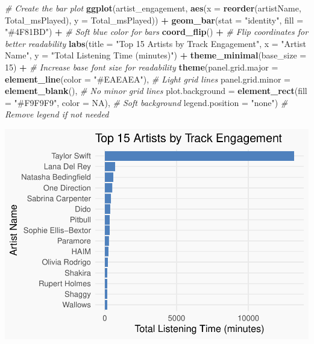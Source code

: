 \documentclass[
]{article}
\newenvironment{Shaded}{\begin{snugshade}}{\end{snugshade}}
\newcommand{\AttributeTok}[1]{\textcolor[rgb]{0.13,0.29,0.53}{#1}}
\newcommand{\CommentTok}[1]{\textcolor[rgb]{0.56,0.35,0.01}{\textit{#1}}}
\newcommand{\ConstantTok}[1]{\textcolor[rgb]{0.56,0.35,0.01}{#1}}
\newcommand{\DecValTok}[1]{\textcolor[rgb]{0.00,0.00,0.81}{#1}}
\newcommand{\FunctionTok}[1]{\textcolor[rgb]{0.13,0.29,0.53}{\textbf{#1}}}
\newcommand{\NormalTok}[1]{#1}
\newcommand{\SpecialCharTok}[1]{\textcolor[rgb]{0.81,0.36,0.00}{\textbf{#1}}}
\newcommand{\StringTok}[1]{\textcolor[rgb]{0.31,0.60,0.02}{#1}}
\begin{document}
\begin{Shaded}
\begin{Highlighting}[]
\CommentTok{\# Create the bar plot}
\FunctionTok{ggplot}\NormalTok{(artist\_engagement, }\FunctionTok{aes}\NormalTok{(}\AttributeTok{x =} \FunctionTok{reorder}\NormalTok{(artistName, Total\_msPlayed), }\AttributeTok{y =}\NormalTok{ Total\_msPlayed)) }\SpecialCharTok{+}
  \FunctionTok{geom\_bar}\NormalTok{(}\AttributeTok{stat =} \StringTok{"identity"}\NormalTok{, }\AttributeTok{fill =} \StringTok{"\#4F81BD"}\NormalTok{) }\SpecialCharTok{+}  \CommentTok{\# Soft blue color for bars}
  \FunctionTok{coord\_flip}\NormalTok{() }\SpecialCharTok{+}  \CommentTok{\# Flip coordinates for better readability}
  \FunctionTok{labs}\NormalTok{(}\AttributeTok{title =} \StringTok{"Top 15 Artists by Track Engagement"}\NormalTok{,}
       \AttributeTok{x =} \StringTok{"Artist Name"}\NormalTok{, }\AttributeTok{y =} \StringTok{"Total Listening Time (minutes)"}\NormalTok{) }\SpecialCharTok{+}
  \FunctionTok{theme\_minimal}\NormalTok{(}\AttributeTok{base\_size =} \DecValTok{15}\NormalTok{) }\SpecialCharTok{+}  \CommentTok{\# Increase base font size for readability}
  \FunctionTok{theme}\NormalTok{(}\AttributeTok{panel.grid.major =} \FunctionTok{element\_line}\NormalTok{(}\AttributeTok{color =} \StringTok{"\#EAEAEA"}\NormalTok{),  }\CommentTok{\# Light grid lines}
        \AttributeTok{panel.grid.minor =} \FunctionTok{element\_blank}\NormalTok{(),  }\CommentTok{\# No minor grid lines}
        \AttributeTok{plot.background =} \FunctionTok{element\_rect}\NormalTok{(}\AttributeTok{fill =} \StringTok{"\#F9F9F9"}\NormalTok{, }\AttributeTok{color =} \ConstantTok{NA}\NormalTok{),  }\CommentTok{\# Soft background}
        \AttributeTok{legend.position =} \StringTok{"none"}\NormalTok{)  }\CommentTok{\# Remove legend if not needed}
\end{Highlighting}
\end{Shaded}

\includegraphics{SpotifyProjectPDF_files/figure-latex/unnamed-chunk-13-1.pdf}
\end{document}
